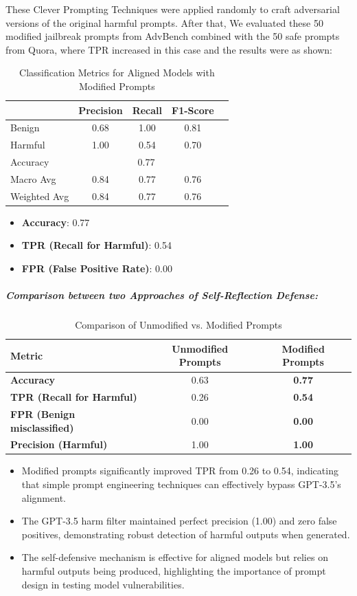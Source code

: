 \documentclass[../main.tex]{subfiles}
\begin{document}
These Clever Prompting Techniques were applied randomly to craft adversarial versions of the original harmful prompts. After that, We evaluated these 50 modified jailbreak prompts from AdvBench combined with the 50 safe prompts from Quora, where TPR increased in this case  and the results were as shown:

\begin{table}[h]
\centering
\caption{Classification Metrics for Aligned Models with Modified Prompts}
\begin{tabular}{lcccc}
\toprule
 & Precision & Recall & F1-Score \\
\midrule
Benign & 0.68 & 1.00 & 0.81  \\
Harmful & 1.00 & 0.54 & 0.70\\
\midrule
Accuracy & \multicolumn{3}{c}{0.77}  \\
Macro Avg & 0.84 & 0.77 & 0.76 \\
Weighted Avg & 0.84 & 0.77 & 0.76  \\
\bottomrule
\end{tabular}
\end{table}

\begin{itemize}
    \item \textbf{Accuracy}: 0.77
    \item \textbf{TPR (Recall for Harmful)}: 0.54
    \item \textbf{FPR (False Positive Rate)}: 0.00
\end{itemize}


\subparagraph*{Comparison between two Approaches of Self-Reflection Defense:}
\vspace{1cm}
\begin{table}[h]
\centering
\caption{Comparison of Unmodified vs. Modified Prompts}
\begin{tabular}{lcc}
\toprule
Metric & Unmodified Prompts & Modified Prompts \\
\midrule
\textbf{Accuracy} & 0.63 & \textbf{0.77} \\
\textbf{TPR (Recall for Harmful)} & 0.26 & \textbf{0.54} \\
\textbf{FPR (Benign misclassified)} & 0.00 & \textbf{0.00} \\
\textbf{Precision (Harmful)} & 1.00 & \textbf{1.00} \\
\bottomrule
\end{tabular}
\end{table}


\begin{itemize}
    \item Modified prompts significantly improved TPR from 0.26 to 0.54, indicating that simple prompt engineering techniques can effectively bypass GPT-3.5's alignment.
    \item The GPT-3.5 harm filter maintained perfect precision (1.00) and zero false positives, demonstrating robust detection of harmful outputs when generated.
    \item The self-defensive mechanism is effective for aligned models but relies on harmful outputs being produced, highlighting the importance of prompt design in testing model vulnerabilities.
\end{itemize}
\end{document}
